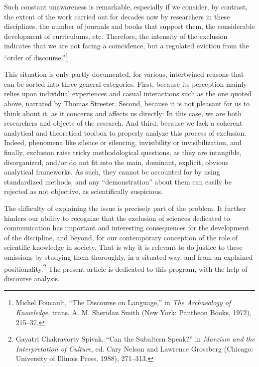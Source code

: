 \documentclass{tufte-handout}
\begin{document}
Such constant unawareness is remarkable, especially if we consider, by
contrast, the extent of the work carried out for decades now by
researchers in these disciplines, the number of journals and books that
support them, the considerable development of curriculums, etc.
Therefore, the intensity of the exclusion indicates that we are not
facing a coincidence, but a regulated eviction from the ``order of
discourse.''\footnote{Michel Foucault, ``The Discourse on Language,'' in
  \emph{The Archaeology of Knowledge}, trans. A. M. Sheridan Smith (New
  York: Pantheon Books, 1972), 215--37.}

This situation is only partly documented, for various, intertwined
reasons that can be sorted into three general categories. First, because
its perception mainly relies upon individual experiences and casual
interactions such as the one quoted above, narrated by Thomas Streeter.
Second, because it is not pleasant for us to think about it, as it
concerns and affects us directly: In this case, we are both researchers
and objects of the research. And third, because we lack a coherent
analytical and theoretical toolbox to properly analyze this process of
exclusion. Indeed, phenomena like silence or silencing, invisibility or
invisibilization, and finally, exclusion raise tricky methodological
questions, as they are intangible, disorganized, and/or do not fit into
the main, dominant, explicit, obvious analytical frameworks. As such,
they cannot be accounted for by using standardized methods, and any
``demonstration'' about them can easily be rejected as not objective, as
scientifically suspicious.

The difficulty of explaining the issue is precisely part of the problem.
It further hinders our ability to recognize that the exclusion of
sciences dedicated to communication has important and interesting
consequences for the development of the discipline, and beyond, for our
contemporary conception of the role of scientific knowledge in society.
That is why it is relevant to do justice to these omissions by studying
them thoroughly, in a situated way, and from an explained
positionality.\footnote{Gayatri Chakravorty Spivak, ``Can the Subaltern
  Speak?'' in \emph{Marxism and the Interpretation of Culture}, ed. Cary
  Nelson and Lawrence Grossberg (Chicago: University of Illinois Press,
  1988), 271--313.} The present article is dedicated to this program,
with the help of discourse analysis.
\end{document}
